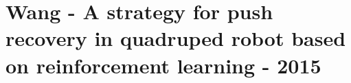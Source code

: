 \section{Wang - A strategy for push recovery in quadruped robot based on reinforcement learning - 2015}